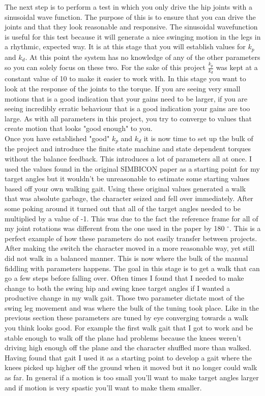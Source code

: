 \documentclass[12pt, a4paper]{article}
\begin{document}
The next step is to perform a test in which you only drive the hip joints with a sinusoidal wave function. The purpose of this is to ensure that you can drive the joints and that they look reasonable and responsive. The sinusoidal wavefunction is useful for this test because it will generate a nice swinging motion in the legs in a rhythmic, expected way. It is at this stage that you will establish values for $k_p$ and $k_d$. At this point the system has no knowledge of any of the other parameters so you can solely focus on these two. For the sake of this project $\frac{k_p}{k_d}$ was kept at a constant value of 10 to make it easier to work with. In this stage you want to look at the response of the joints to the torque. If you are seeing very small motions that is a good indication that your gains need to be larger, if you are seeing incredibly erratic behaviour that is a good indication your gains are too large. As with all parameters in this project, you try to converge to values that create motion that looks "good enough" to you. \\

Once you have established "good" $k_p$ and $k_d$ it is now time to set up the bulk of the project and introduce the finite state machine and state dependent torques without the balance feedback. This introduces a lot of parameters all at once. I used the values found in the original SIMBICON paper \cite{Yin07} as a starting point for my target angles but it wouldn't be unreasonable to estimate some starting values based off your own walking gait. Using these original values generated a walk that was absolute garbage, the character seized and fell over immediately. After some poking around it turned out that all of the target angles needed to be multiplied by a value of -1. This was due to the fact the reference frame for all of my joint rotations was different from the one used in the paper by 180 $^\circ$. This is a perfect example of how these parameters do not easily transfer between projects.\\ 

After making the switch the character moved in a more reasonable way, yet still did not walk in a balanced manner. This is now where the bulk of the manual fiddling with parameters happens. The goal in this stage is to get a walk that can go a few steps before falling over. Often times I found that I needed to make change to both the swing hip and swing knee target angles if I wanted a productive change in my walk gait. Those two parameter dictate most of the swing leg movement and was where the bulk of the tuning took place. Like in the previous section these parameters are tuned by eye converging towards a walk you think looks good. For example the first walk gait that I got to work and be stable enough to walk off the plane had problems because the knees weren't driving high enough off the plane and the character shuffled more than walked. Having found that gait I used it as a starting point to develop a gait where the knees picked up higher off the ground when it moved but it no longer could walk as far. In general if a motion is too small you'll want to make target angles larger and if motion is very spastic you'll want to make them smaller.\\
\end{document}

